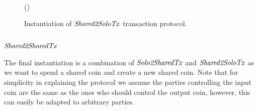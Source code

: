 \begin{figure}
\begin{center}
{\begin{varwidth}{\textwidth}
{            \procVerfProof{\varProofBob}  \< \< \\
            \varSigFin \opFunResult \procFinSig{\varSigAlice}{\varSigBob} \< \< \\
            \varExcess \opAssign {} \opAddPoint {} \< \< \\
            \pcreturn \varTx \opAssign \varTx \opUnion (\varExcess \opSeperate \varSigFin)
            }
        \end{varwidth}
        }
    \end{center}
    \caption{Instantiation of $\mathit{Shared2SoloTx}$ transaction protocol. \label{fig:Mu2SoTx}}
\end{figure}

\subsection{$\mathit{Shared2SharedTx}$}

The final instantiation is a combination of $\mathit{Solo2SharedTx}$ and $\mathit{Shared2SoloTx}$ as we want to spend a shared coin and create a new shared coin. Note that for simplicity in explaining the protocol we assume the parties controlling the
input coin are the same as the ones who should control the output coin, however, this can easily be adapted to arbitrary parties.

